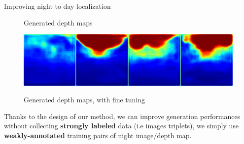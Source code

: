 \begin{frame}{Improving night to day localization}
\begin{minipage}{0.7\linewidth}
\begin{figure}
\begin{minipage}{0.74\linewidth}
		\end{minipage}
		\begin{minipage}{0.21\linewidth}
			\raggedright \footnotesize
			Generated depth maps
		\end{minipage}
	\end{figure}
		\vspace{-0.5cm}
		\begin{figure}
			\centering
			\begin{minipage}{0.74\linewidth}
				\includegraphics[width=\linewidth]{im/res/night_ft}
			\end{minipage}
			\begin{minipage}{0.21\linewidth}
				\raggedright \footnotesize
				Generated depth maps, with fine tuning
			\end{minipage}
		\end{figure}
\end{minipage}
	\hfill
	\begin{minipage}{0.29\linewidth}
		\raggedleft
		Thanks to the design of our method, we can improve generation performances without collecting \textbf{strongly labeled} data (i.e images triplets), we simply use \textbf{weakly-annotated} training pairs of night image/depth map.		
	\end{minipage}


\end{frame}

